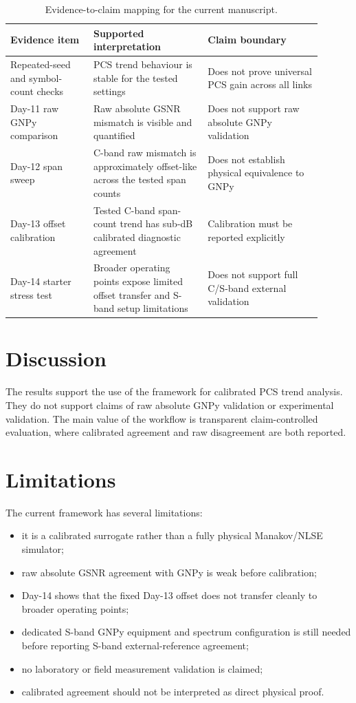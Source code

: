 ﻿\documentclass[pdflatex,sn-mathphys-num]{sn-jnl}
\begin{document}
\begin{table}[t]
\centering
\small
\caption{Evidence-to-claim mapping for the current manuscript.}
\label{tab:evidence-claim-map}
\begin{tabular}{p{0.24\linewidth} p{0.33\linewidth} p{0.33\linewidth}}
\toprule
Evidence item & Supported interpretation & Claim boundary \\
\midrule
Repeated-seed and symbol-count checks & PCS trend behaviour is stable for the tested settings & Does not prove universal PCS gain across all links \\
Day-11 raw GNPy comparison & Raw absolute GSNR mismatch is visible and quantified & Does not support raw absolute GNPy validation \\
Day-12 span sweep & C-band raw mismatch is approximately offset-like across the tested span counts & Does not establish physical equivalence to GNPy \\
Day-13 offset calibration & Tested C-band span-count trend has sub-dB calibrated diagnostic agreement & Calibration must be reported explicitly \\
Day-14 starter stress test & Broader operating points expose limited offset transfer and S-band setup limitations & Does not support full C/S-band external validation \\
\bottomrule
\end{tabular}
\end{table}

\section{Discussion}

The results support the use of the framework for calibrated PCS trend analysis. They do not support claims of raw absolute GNPy validation or experimental validation. The main value of the workflow is transparent claim-controlled evaluation, where calibrated agreement and raw disagreement are both reported.

\section{Limitations}

The current framework has several limitations:
\begin{itemize}
    \item it is a calibrated surrogate rather than a fully physical Manakov/NLSE simulator;
    \item raw absolute GSNR agreement with GNPy is weak before calibration;
    \item Day-14 shows that the fixed Day-13 offset does not transfer cleanly to broader operating points;
    \item dedicated S-band GNPy equipment and spectrum configuration is still needed before reporting S-band external-reference agreement;
    \item no laboratory or field measurement validation is claimed;
    \item calibrated agreement should not be interpreted as direct physical proof.
\end{itemize}
\end{document}
